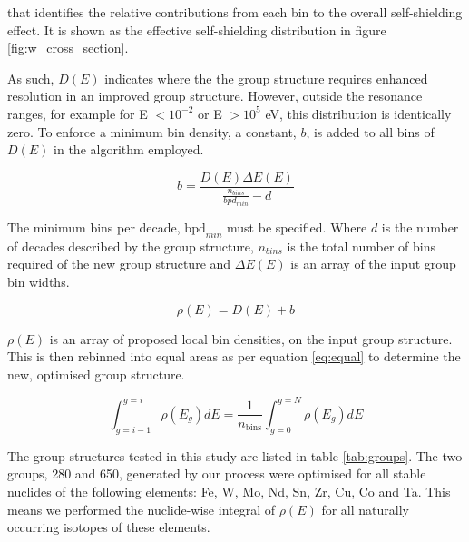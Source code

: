 that identifies the relative contributions from each bin to the overall self-shielding effect. It is shown as the effective self-shielding distribution in figure \ref{fig:w_cross_section}.

As such, $D(E)$ indicates where the the group structure requires enhanced resolution in an improved group structure. However, outside the resonance ranges, for example for E $< 10^{-2}$ or E $> 10^{5}$ eV, this distribution is identically zero. To enforce a minimum bin density, a constant, $b$, is added to all bins of $D(E)$ in the algorithm employed. 

\begin{equation}
\label{eq:b}
b = \frac{D(E) \Delta E(E)}{\frac{n_{bins}}{bpd_{min}} - d}
\end{equation}

The minimum bins per decade, $\mathrm{bpd}_{min}$ must be specified. Where $d$ is the number of decades described by the group structure, $n_{bins}$ is the total number of bins required of the new group structure and $\Delta E(E)$ is an array of the input group bin widths.

\begin{equation}
\label{eq:offset}
\rho(E) = D(E) + b
\end{equation}

$\rho(E)$ is an array of proposed local bin densities, on the input group structure. This is then rebinned into equal areas as per equation \ref{eq:equal} to determine the new, optimised group structure.

\begin{equation}
\label{eq:equal}
\int_{g=i-1}^{g=i} \rho(E_{g})dE = \frac{1}{n_\mathrm{bins}}\int_{g=0}^{g=N}\rho(E_{g})dE \end{equation} 

The group structures tested in this study are listed in table \ref{tab:groups}. The two groups, 280 and 650, generated by our process were optimised for all stable nuclides of the following elements: Fe, W, Mo, Nd, Sn, Zr, Cu, Co and Ta. This means we performed the nuclide-wise integral of $\rho(E)$ for all naturally occurring isotopes of these elements. 

